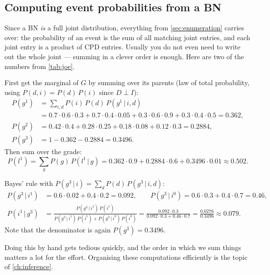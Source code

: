 \documentclass[11pt, oneside]{book}
\newcommand{\Prob}{\mathbb{P}}           %
\newcommand{\given}{\,\vert\,}           %
\newcommand{\indep}{\perp}               %
\let\originalsubsection\subsection
\renewcommand{\subsection}{\Needspace{6\baselineskip}\originalsubsection}
\begin{document}
\subsection{Computing event probabilities from a BN}
\label{sec:bn-event-probs}

Since a BN \emph{is} a full joint distribution, everything from
\cref{sec:enumeration} carries over: the probability of an event is the sum of
all matching joint entries, and each joint entry is a product of CPD entries.
Usually you do not even need to write out the whole joint --- summing in a
clever order is enough. Here are two of the numbers from \cref{tab:joe}.

\begin{exbox}[title={The prior probability of a strong letter, $P(l^1)$}]
First get the marginal of $G$ by summing over its parents (law of total
probability, using $P(d, i) = P(d)\,P(i)$ since $D \indep I$):
\begin{align*}
P(g^1) &= \textstyle\sum_{i,d} P(i)\,P(d)\,P(g^1 \given i, d) \\
 &= 0.7\!\cdot\!0.6\!\cdot\!0.3 + 0.7\!\cdot\!0.4\!\cdot\!0.05
 + 0.3\!\cdot\!0.6\!\cdot\!0.9 + 0.3\!\cdot\!0.4\!\cdot\!0.5 = 0.362, \\
P(g^2) &= 0.42\!\cdot\!0.4 + 0.28\!\cdot\!0.25 + 0.18\!\cdot\!0.08
 + 0.12\!\cdot\!0.3 = 0.2884, \\
P(g^3) &= 1 - 0.362 - 0.2884 = 0.3496 .
\end{align*}
Then sum over the grade:
\[
P(l^1) = \sum_{g} P(g)\, P(l^1 \given g)
= 0.362 \cdot 0.9 + 0.2884 \cdot 0.6 + 0.3496 \cdot 0.01 \approx 0.502 .
\]
\end{exbox}

\begin{exbox}[title={Evidential reasoning by hand, $P(i^1 \given g^3)$}]
Bayes' rule with $P(g^3 \given i) = \sum_d P(d)\,P(g^3 \given i, d)$:
\begin{align*}
P(g^3 \given i^1) &= 0.6 \cdot 0.02 + 0.4 \cdot 0.2 = 0.092, \qquad
P(g^3 \given i^0) = 0.6 \cdot 0.3 + 0.4 \cdot 0.7 = 0.46, \\
P(i^1 \given g^3) &= \frac{P(g^3 \given i^1)\, P(i^1)}
  {P(g^3 \given i^1)\, P(i^1) + P(g^3 \given i^0)\, P(i^0)}
 = \frac{0.092 \cdot 0.3}{0.092 \cdot 0.3 + 0.46 \cdot 0.7}
 = \frac{0.0276}{0.3496} \approx 0.079 .
\end{align*}
Note that the denominator is again $P(g^3) = 0.3496$.
\end{exbox}

Doing this by hand gets tedious quickly, and the order in which we sum things
matters a lot for the effort. Organising these computations efficiently is
the topic of \cref{ch:inference}.
\end{document}

